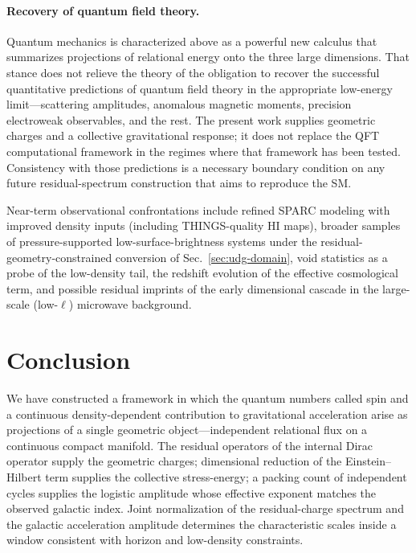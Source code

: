\documentclass[11pt,a4paper]{article}
\begin{document}
\paragraph{Recovery of quantum field theory.}
Quantum mechanics is characterized above as a powerful new calculus that summarizes projections of relational energy onto the three large dimensions. That stance does not relieve the theory of the obligation to recover the successful quantitative predictions of quantum field theory in the appropriate low-energy limit---scattering amplitudes, anomalous magnetic moments, precision electroweak observables, and the rest. The present work supplies geometric charges and a collective gravitational response; it does not replace the QFT computational framework in the regimes where that framework has been tested. Consistency with those predictions is a necessary boundary condition on any future residual-spectrum construction that aims to reproduce the SM.

Near-term observational confrontations include refined SPARC modeling with improved density inputs (including THINGS-quality HI maps), broader samples of pressure-supported low-surface-brightness systems under the residual-geometry-constrained conversion of Sec.~\ref{sec:udg-domain}, void statistics as a probe of the low-density tail, the redshift evolution of the effective cosmological term, and possible residual imprints of the early dimensional cascade in the large-scale (low-\(\ell\)) microwave background.

\section{Conclusion}

We have constructed a framework in which the quantum numbers called spin and a continuous density-dependent contribution to gravitational acceleration arise as projections of a single geometric object---independent relational flux on a continuous compact manifold. The residual operators of the internal Dirac operator supply the geometric charges; dimensional reduction of the Einstein--Hilbert term supplies the collective stress-energy; a packing count of independent cycles supplies the logistic amplitude whose effective exponent matches the observed galactic index. Joint normalization of the residual-charge spectrum and the galactic acceleration amplitude determines the characteristic scales inside a window consistent with horizon and low-density constraints.
\end{document}
